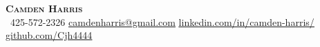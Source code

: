 \begin{center}
    \textbf{\Huge \scshape Camden Harris} \\ \vspace{1pt}
     \ \small 425-572-2326 \quad
    \href{mailto:camdenharris@gmail.com}{ \underline{camdenharris@gmail.com}} \quad
    \href{https://www.linkedin.com/in/camden-harris/}{ \underline{linkedin.com/in/camden-harris/}} \quad
    \href{https://github.com/Cjh4444}{ \underline{github.com/Cjh4444}}
\end{center}